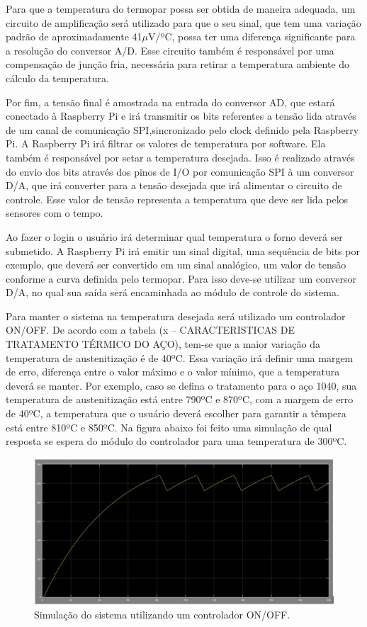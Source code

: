 Para que a temperatura do termopar possa ser obtida de maneira adequada, um circuito de amplificação será utilizado para que o seu sinal, que tem uma variação padrão de aproximadamente 41$\mu$V/ºC, possa ter uma diferença significante para a resolução do conversor A/D. Esse circuito também é responsável por uma compensação de junção fria, necessária para retirar a temperatura ambiente do cálculo da temperatura.

Por fim, a tensão final é amostrada na entrada do conversor AD, que estará conectado à Raspberry Pi e irá transmitir os bits referentes a tensão lida através de um canal de comunicação SPI,sincronizado pelo clock definido pela Raspberry Pi. A Raspberry Pi irá filtrar os valores de temperatura por software. Ela também é responsável por setar a temperatura desejada. Isso é realizado através do envio dos bits através dos pinos de I/O por comunicação SPI à um conversor D/A, que irá converter para a tensão desejada que irá alimentar o circuito de controle. Esse valor de tensão representa a temperatura que deve ser lida pelos sensores com o tempo.

Ao fazer o login o usuário irá determinar qual temperatura o forno deverá ser submetido. A Raspberry Pi irá emitir um sinal digital, uma sequência de bits por exemplo, que deverá ser convertido em um sinal analógico, um valor de tensão conforme a curva definida pelo termopar. Para isso deve-se utilizar um conversor D/A, no qual sua saída será encaminhada ao módulo de controle do sistema.

Para manter o sistema na temperatura desejada será utilizado um controlador ON/OFF. De acordo com a tabela (x – CARACTERISTICAS DE TRATAMENTO TÉRMICO DO AÇO), tem-se que a maior variação da temperatura de austenitização é de 40ºC. Essa variação irá definir uma margem de erro, diferença entre o valor máximo e o valor mínimo, que a temperatura deverá se manter. Por exemplo, caso se defina o tratamento para o aço 1040, sua temperatura de austenitização está entre 790ºC e 870ºC, com a margem de erro de 40ºC, a temperatura que o usuário deverá escolher para garantir a têmpera está entre 810ºC e 850ºC. Na figura abaixo foi feito uma simulação de qual resposta se espera do módulo do controlador para uma temperatura de 300ºC.

\begin{figure}[h]
	\centering
	\label{on_off}
	\includegraphics[keepaspectratio=true,scale=0.8]{figuras/on_off.JPG}
	\caption{Simulação do sistema utilizando um controlador ON/OFF.}
\end{figure}

